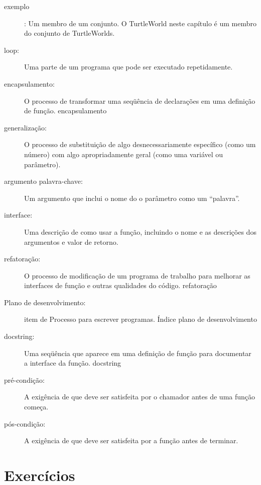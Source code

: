 \documentclass[10pt]{book}
\begin{document}
\begin{exercise}
\begin{description}

\item[exemplo]: Um membro de um conjunto. O TurtleWorld neste
capítulo é um membro do conjunto de TurtleWorlds.

\item[loop:] Uma parte de um programa que pode ser executado repetidamente.

\item[encapsulamento:] O processo de transformar uma seqüência de
declarações em uma definição de função.
\index{} encapsulamento

\item[generalização:] O processo de substituição de algo
desnecessariamente específico (como um número) com algo apropriadamente
geral (como uma variável ou parâmetro).

\item[argumento palavra-chave:] Um argumento que inclui o nome do
o parâmetro como um ``palavra''.

\item[interface:] Uma descrição de como usar a função, incluindo
o nome e as descrições dos argumentos e valor de retorno.

\item[refatoração:] O processo de modificação de um programa de trabalho para
  melhorar as interfaces de função e outras qualidades do código.
\index{} refatoração

\item[Plano de desenvolvimento:] item de Processo para escrever programas.
\index{} Índice plano de desenvolvimento

\item[docstring:] Uma seqüência que aparece em uma definição de função
para documentar a interface da função.
\index{} docstring

\item[pré-condição:] A exigência de que deve ser satisfeita por
o chamador antes de uma função começa.

\item[pós-condição:] A exigência de que deve ser satisfeita por
a função antes de terminar.

\end{description}


\section{Exercícios}


\end{exercise}
\end{document}
